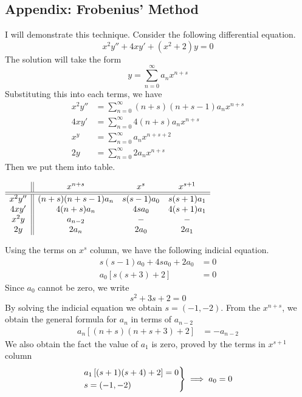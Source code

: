 \documentclass[../../main.tex]{subfiles}
\begin{document}
\subsection*{Appendix: Frobenius' Method}
I will demonstrate this technique. Consider the following differential equation.
\begin{equation*}
  x^2 y''+ 4xy' + (x^2 + 2)y = 0
\end{equation*}
The solution will take the form 
\begin{equation*}
  y=\sum_{n=0}^{\infty} a_nx^{n+s}
\end{equation*}
Substituting this into each terms, we have 
\begin{align*}
  x^2y''&=\sum_{n=0}^{\infty} (n+s) (n+s-1)a_nx^{n+s} \\
  4xy'&=\sum_{n=0}^{\infty} 4(n+s) a_nx^{n+s}\\
  x^y&=\sum_{n=0}^{\infty} a_n x^{n+s+2}\\
  2y&=\sum_{n=0}^{\infty} 2a_nx^{n+s}
\end{align*}
Then we put them into table.
\begin{center}
$\begin{array}{c || c c c}
  &x^{n+s}&x^s&x^{s+1}\\
  \hline\hline
  x^2y''&(n + s)(n + s - 1)a_n &s(s-1)a_0  &s(s+1)a_1 \\
  4xy'&4(n+s)a_n &4sa_0 &4(s+1)a_1 \\
  x^2y&a_{n-2} &-&- \\
  2y& 2a_n& 2a_0& 2a_1\\
\end{array}$
\end{center}
Using the terms on $x^{s}$ column, we have the following indicial equation.
\begin{align*}
  s(s-1)a_0+4sa_0+2a_0&=0\\
  a_0 \left[s(s+3)+2 \right] &=0
\end{align*}
Since $a_0$ cannot be zero, we write 
\begin{equation*}
  s^2+3s+2 =0
\end{equation*}
By solving the indicial equation we obtain $s=(-1,-2)$. From the $x^{n+s}$, we obtain the general formula for $a_n$ in terms of $a_{n-2}$
\begin{align*}
  a_n\left[(n+s)(n+s+3)+2\right]&=-a_{n-2}
\end{align*}
We also obtain the fact the value of $a_1$ is zero, proved by the terms in $x^{s+1}$ column 
\begin{equation*}
  \begin{rcases*}
    a_1\left[(s+1)(s+4)+2\right]=0\\
    s=(-1,-2)
  \end{rcases*}\implies a_0=0
\end{equation*}
\end{document}
